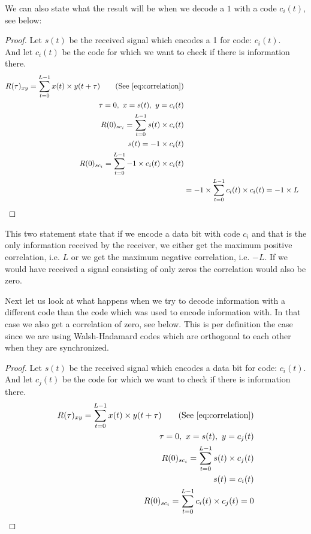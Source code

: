 		We can also state what the result will be when we decode a $1$ with a code $c_i(t)$, see below:

		\begin{proof}
			Let $s(t)$ be the received signal which encodes a 1 for code: $c_i(t)$.\\
			And let $c_i(t)$ be the code for which we want to check if there is information there. \\

			\begin{align*}
				R(\tau)_{xy} = \displaystyle\sum_{t = 0} ^ {L - 1} x(t) \times y(t + \tau)	\tag{See \autoref{eq:correlation}}
				\\ \tau = 0,\ x = s(t),\ y = c_i(t)	
				\\ R(0)_{sc_{i}} = \displaystyle\sum_{t = 0} ^ {L - 1} s(t) \times c_i(t)	
				\\ s(t) = -1 \times c_i(t)															
				\\ R(0)_{sc_{i}} = \displaystyle\sum_{t = 0} ^ {L - 1} -1 \times c_i(t) \times c_i(t)
				\\ &= -1 \times \displaystyle\sum_{t = 0} ^ {L - 1} c_i(t) \times c_i(t) = -1 \times L
			\end{align*}

		\end{proof}

		This two statement state that if we encode a data bit with code $c_i$ and that is the only information received by the receiver, we either get the maximum positive correlation, i.e. $L$ or we get the maximum negative correlation, i.e. $-L$.
		If we would have received a signal consisting of only zeros the correlation would also be zero.

		Next let us look at what happens when we try to decode information with a different code than the code which was used to encode information with. In that case we also get a correlation of zero, see below. This is per definition the case since we are using Walsh-Hadamard codes which are orthogonal to each other when they are synchronized.

		\begin{proof}
			Let $s(t)$ be the received signal which encodes a data bit for code: $c_i(t)$.\\
			And let $c_j(t)$ be the code for which we want to check if there is information there. \\

			\begin{align*}
				R(\tau)_{xy} = \displaystyle\sum_{t = 0} ^ {L - 1} x(t) \times y(t + \tau)	\tag{See \autoref{eq:correlation}}
				\\ \tau = 0,\ x = s(t),\ y = c_j(t)	
				\\ R(0)_{sc_{i}} = \displaystyle\sum_{t = 0} ^ {L - 1} s(t) \times c_j(t)	
				\\ s(t) = c_i(t)															
				\\ R(0)_{sc_{i}} = \displaystyle\sum_{t = 0} ^ {L - 1} c_i(t) \times c_j(t) = 0
			\end{align*}

		\end{proof}


